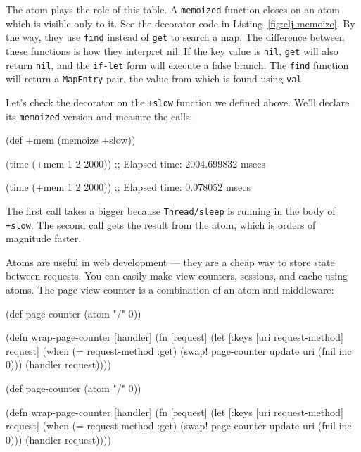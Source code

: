 The atom plays the role of this table.
A \verb|memoized| function closes on an atom which is visible only to it.
See the decorator code in Listing~\ref{fig:clj-memoize}.
By the way, they use \verb|find| instead of \verb|get| to search a map. The difference between these functions is how they interpret nil. If the key value is \verb|nil|, \verb|get| will also return \verb|nil|, and the \verb|if-let| form will execute a false branch.
The \verb|find| function will return a \verb|MapEntry| pair, the value from which is found using \verb|val|.

Let's check the decorator on the \verb|+slow| function we defined above. We'll declare its \verb|memoized| version and measure the calls:

\begin{clojure}
(def +mem (memoize +slow))

(time (+mem 1 2 2000))
;; Elapsed time: 2004.699832 msecs

(time (+mem 1 2 2000))
;; Elapsed time: 0.078052 msecs
\end{clojure}


The first call takes a bigger because \verb|Thread/sleep| is running in the body of \verb|+slow|. The second call gets the result from the atom, which is orders of magnitude faster.


Atoms are useful in web development — they are a cheap way to store state between requests.
You can easily make view counters, sessions, and cache using atoms.
The page view counter is a combination of an atom and middleware:

\ifx\DEVICETYPE\MOBILE

\begin{clojure}
(def page-counter
  (atom {"/" 0}))

(defn wrap-page-counter
  [handler]
  (fn [request]
    (let [{:keys [uri request-method]}
          request]
      (when (= request-method :get)
        (swap! page-counter
          update uri (fnil inc 0)))
      (handler request))))
\end{clojure}

\else

\begin{clojure}
(def page-counter
  (atom {"/" 0}))

(defn wrap-page-counter
  [handler]
  (fn [request]
    (let [{:keys [uri
                  request-method]} request]
      (when (= request-method :get)
        (swap! page-counter update uri (fnil inc 0)))
      (handler request))))
\end{clojure}

